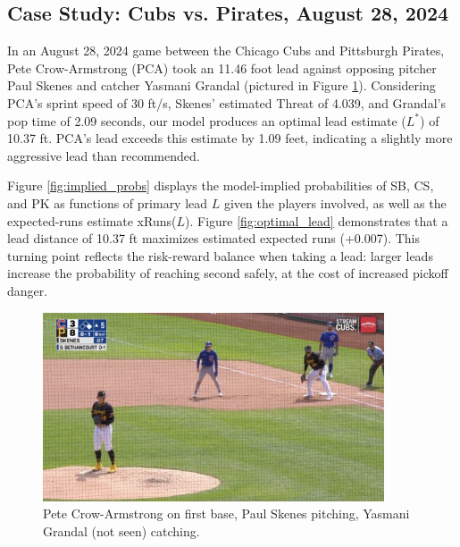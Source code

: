\documentclass[12pt,letterpaper]{article}
\begin{document}
\subsection{Case Study: Cubs vs. Pirates, August 28, 2024}

In an August 28, 2024 game between the Chicago Cubs and Pittsburgh Pirates, Pete Crow-Armstrong (PCA) took an 11.46 foot lead against opposing pitcher Paul Skenes and catcher Yasmani Grandal (pictured in Figure \ref{fig:example_case}). Considering PCA's sprint speed of 30 ft/s, Skenes' estimated Threat of 4.039, and Grandal's pop time of 2.09 seconds, our model produces an optimal lead estimate ($L^*$) of 10.37 ft. PCA's lead exceeds this estimate by 1.09 feet, indicating a slightly more aggressive lead than recommended.

Figure \ref{fig:implied_probs} displays the model-implied probabilities of SB, CS, and PK as functions of primary lead $L$ given the players involved, as well as the expected-runs estimate xRuns($L$). Figure \ref{fig:optimal_lead} demonstrates that a lead distance of 10.37 ft maximizes estimated expected runs (+0.007). This turning point reflects the risk-reward balance when taking a lead: larger leads increase the probability of reaching second safely, at the cost of increased pickoff danger.
 
\begin{figure}[H]
    \centering
    \includegraphics[width=0.9\textwidth]{figures/pca.png}
    \caption{Pete Crow-Armstrong on first base, Paul Skenes pitching, Yasmani Grandal (not seen) catching. \cite{CubsvPirates2024}}
    \label{fig:example_case}
\end{figure}
\end{document}
